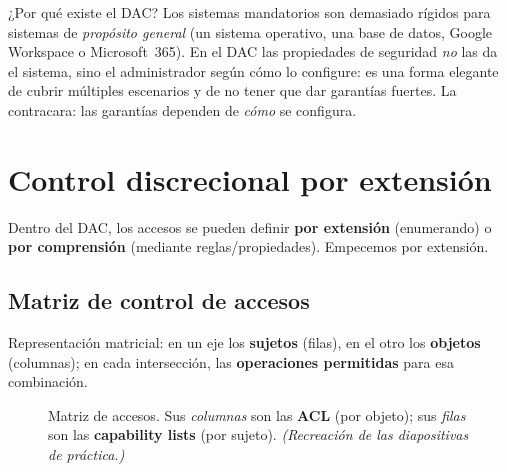 \documentclass[11pt,a4paper]{article}
\begin{document}
\begin{anecbox}{¿Por qué existe el DAC?}
Los sistemas mandatorios son demasiado rígidos para sistemas de \emph{propósito general} (un
sistema operativo, una base de datos, Google Workspace o Microsoft~365). En el DAC las
propiedades de seguridad \emph{no} las da el sistema, sino el administrador según cómo lo
configure: es una forma elegante de cubrir múltiples escenarios y de no tener que dar garantías
fuertes. La contracara: las garantías dependen de \emph{cómo} se configura.
\end{anecbox}

\section{Control discrecional por extensión}

Dentro del DAC, los accesos se pueden definir \textbf{por extensión} (enumerando) o
\textbf{por comprensión} (mediante reglas/propiedades). Empecemos por extensión.

\subsection{Matriz de control de accesos}
Representación matricial: en un eje los \textbf{sujetos} (filas), en el otro los
\textbf{objetos} (columnas); en cada intersección, las \textbf{operaciones permitidas} para
esa combinación.

\begin{figure}[h]
\centering
{}
\caption{Matriz de accesos. Sus \emph{columnas} son las \textbf{ACL} (por objeto); sus
\emph{filas} son las \textbf{capability lists} (por sujeto). \textit{(Recreación de las
diapositivas de práctica.)}}
\end{figure}
\end{document}
